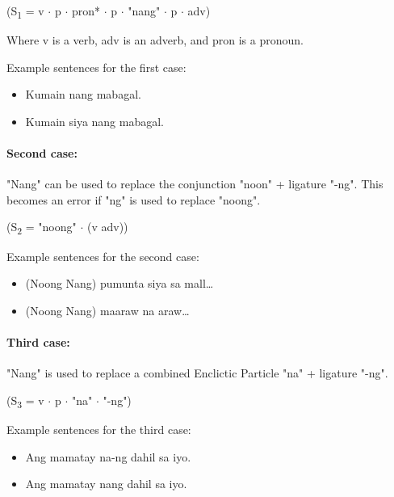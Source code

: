 \begin{center}
      (S\textsubscript{1} = v \(\cdot\) p \(\cdot\) pron* \(\cdot\) p \(\cdot\)
      "nang" \(\cdot\) p \(\cdot\) adv)
\end{center}

Where v is a verb, adv is an adverb, and pron is a pronoun.

\begin{example}
      Example sentences for the first case:
\end{example}
\begin{itemize}
      \item Kumain nang mabagal.
      \item             Kumain siya nang mabagal.

\end{itemize}

\paragraph{Second case:} "Nang" can be used to replace the conjunction "noon" +
ligature "-ng". This becomes an error if "ng" is used to replace "noong".

\begin{center}
      (S\textsubscript{2} = "noong" \(\cdot\) (v {\textpipe} adv))
\end{center}

\begin{example}
      Example sentences for the second case:
\end{example}

\begin{itemize}
      \item (Noong {\textpipe} Nang) pumunta siya sa mall…
      \item (Noong {\textpipe} Nang) maaraw na araw…
\end{itemize}

\paragraph{Third case:} "Nang" is used to replace a combined Enclictic Particle
"na" + ligature "-ng".

\begin{center}
      (S\textsubscript{3} = v \(\cdot\) p \(\cdot\) "na" \(\cdot\) "-ng")
\end{center}

\begin{example}
      Example sentences for the third case:
\end{example}
\begin{itemize}
      \item Ang mamatay na-ng dahil sa iyo.
      \item Ang mamatay nang dahil sa iyo.
\end{itemize}

